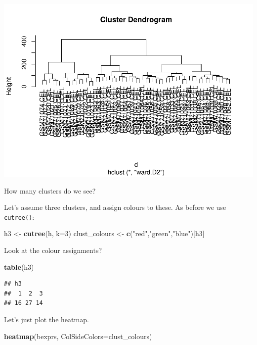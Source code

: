 \documentclass[
]{book}
\newenvironment{Shaded}{\begin{snugshade}}{\end{snugshade}}
\newcommand{\AttributeTok}[1]{\textcolor[rgb]{0.13,0.29,0.53}{#1}}
\newcommand{\DecValTok}[1]{\textcolor[rgb]{0.00,0.00,0.81}{#1}}
\newcommand{\FunctionTok}[1]{\textcolor[rgb]{0.13,0.29,0.53}{\textbf{#1}}}
\newcommand{\NormalTok}[1]{#1}
\newcommand{\OtherTok}[1]{\textcolor[rgb]{0.56,0.35,0.01}{#1}}
\newcommand{\StringTok}[1]{\textcolor[rgb]{0.31,0.60,0.02}{#1}}
\begin{document}
\includegraphics{_main_files/figure-latex/bladder-hclust-1.pdf}

How many clusters do we see?

Let's assume three clusters, and assign colours to these. As before we use \texttt{cutree()}:

\begin{Shaded}
\begin{Highlighting}[]
\NormalTok{h3 }\OtherTok{\textless{}{-}} \FunctionTok{cutree}\NormalTok{(h, }\AttributeTok{k=}\DecValTok{3}\NormalTok{)}
\NormalTok{clust\_colours }\OtherTok{\textless{}{-}} \FunctionTok{c}\NormalTok{(}\StringTok{"red"}\NormalTok{,}\StringTok{"green"}\NormalTok{,}\StringTok{"blue"}\NormalTok{)[h3]}
\end{Highlighting}
\end{Shaded}

Look at the colour assignments?

\begin{Shaded}
\begin{Highlighting}[]
\FunctionTok{table}\NormalTok{(h3)}
\end{Highlighting}
\end{Shaded}

\begin{verbatim}
## h3
##  1  2  3 
## 16 27 14
\end{verbatim}

Let's just plot the heatmap.

\begin{Shaded}
\begin{Highlighting}[]
\FunctionTok{heatmap}\NormalTok{(bexprs,}
    \AttributeTok{ColSideColors=}\NormalTok{clust\_colours)}
\end{Highlighting}
\end{Shaded}
\end{document}
